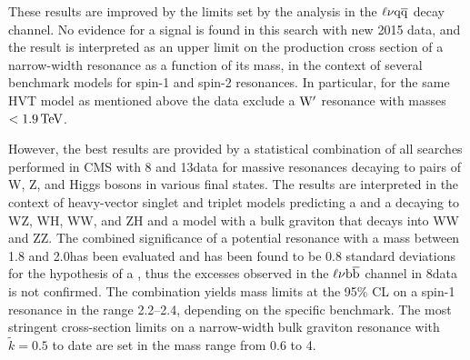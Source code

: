 These results are improved by the limits set by the analysis in the $\ell\nu\mathrm{q}\overline{\mathrm{q}}$ decay channel.
No evidence for a signal is found in this search with new 2015 data, and the result is interpreted as an upper limit on the production cross section of a narrow-width resonance as a function of its mass,
in the context of several benchmark models for spin-1 and spin-2 resonances. In particular, for the same HVT model as mentioned above the data exclude a $\mathrm{W}^\prime$ resonance with masses $< 1.9\,\text{Te\hspace{-.08em}V}$.

However, the best results are provided by a statistical combination of all searches performed in CMS with 8 and 13\TeV data for massive resonances decaying to pairs of W, Z, and Higgs bosons in various final states.
The results are interpreted in the context of heavy-vector singlet and triplet models predicting a \Wpr and a \Zpr decaying to WZ, WH, WW, and ZH and a model with a bulk graviton that decays into WW and ZZ.
The combined significance of a potential resonance with a mass between 1.8 and 2.0\TeV has been evaluated and has been found to be 0.8 standard deviations for the hypothesis of a \Wpr,
thus the excesses observed in the $\ell\nu{\mathrm{b}\overline{\mathrm{b}}}$ channel in 8\TeV data is not confirmed.
The combination yields mass limits at the 95\% CL on a spin-1 resonance in the range 2.2--2.4\TeV, depending on the specific benchmark.
The most stringent cross-section limits on a narrow-width bulk graviton resonance with $\tilde{k} = 0.5$ to date are set in the mass range from 0.6 to 4\TeV.
